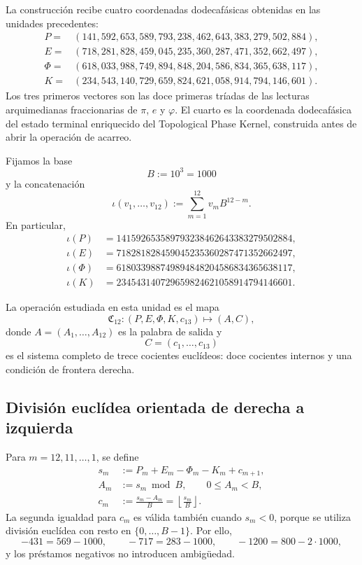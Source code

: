 La construcción recibe cuatro coordenadas dodecafásicas obtenidas en las
unidades precedentes:
\[
\begin{aligned}
 P={}&(141,592,653,589,793,238,462,643,383,279,502,884),\\
 E={}&(718,281,828,459,045,235,360,287,471,352,662,497),\\
 \Phi={}&(618,033,988,749,894,848,204,586,834,365,638,117),\\
 K={}&(234,543,140,729,659,824,621,058,914,794,146,601).
\end{aligned}
\]
Los tres primeros vectores son las doce primeras tríadas de las lecturas
arquimedianas fraccionarias de \(\pi\), \(e\) y \(\varphi\). El cuarto es
la coordenada dodecafásica del estado terminal enriquecido del Topological
Phase Kernel, construida antes de abrir la operación de acarreo.

Fijamos la base
\[
 B:=10^3=1000
\]
y la concatenación
\begin{equation}
 \iota(v_1,\ldots,v_{12})
 :=\sum_{m=1}^{12}v_mB^{12-m}.
 \label{p3-83-c25-s5:eq:concatenacion-base-mil-alpha}
\end{equation}
En particular,
\[
\begin{aligned}
 \iota(P)&=141592653589793238462643383279502884,\\
 \iota(E)&=718281828459045235360287471352662497,\\
 \iota(\Phi)&=618033988749894848204586834365638117,\\
 \iota(K)&=234543140729659824621058914794146601.
\end{aligned}
\]

La operación estudiada en esta unidad es el mapa
\begin{equation}
 \mathfrak C_{12}:
 (P,E,\Phi,K,c_{13})
 \longmapsto(A,C),
 \label{p3-83-c25-s5:eq:mapa-cierre-dodecafasico-alpha}
\end{equation}
donde \(A=(A_1,\ldots,A_{12})\) es la palabra de salida y
\[
 C=(c_1,\ldots,c_{13})
\]
es el sistema completo de trece cocientes euclídeos: doce cocientes
internos y una condición de frontera derecha.

\subsection{División euclídea orientada de derecha a izquierda}

Para \(m=12,11,\ldots,1\), se define
\begin{equation}
\begin{aligned}
 s_m&:=P_m+E_m-\Phi_m-K_m+c_{m+1},\\
 A_m&:=s_m\bmod B,
       \qquad 0\leq A_m<B,\\
 c_m&:=\frac{s_m-A_m}{B}
      =\left\lfloor\frac{s_m}{B}\right\rfloor .
\end{aligned}
\label{p3-83-c25-s5:eq:recurrencia-corta-alpha}
\end{equation}
La segunda igualdad para \(c_m\) es válida también cuando \(s_m<0\),
porque se utiliza división euclídea con resto en
\(\{0,\ldots,B-1\}\). Por ello,
\[
 -431=569-1000,
 \qquad
 -717=283-1000,
 \qquad
 -1200=800-2\cdot1000,
\]
y los préstamos negativos no introducen ambigüedad.

